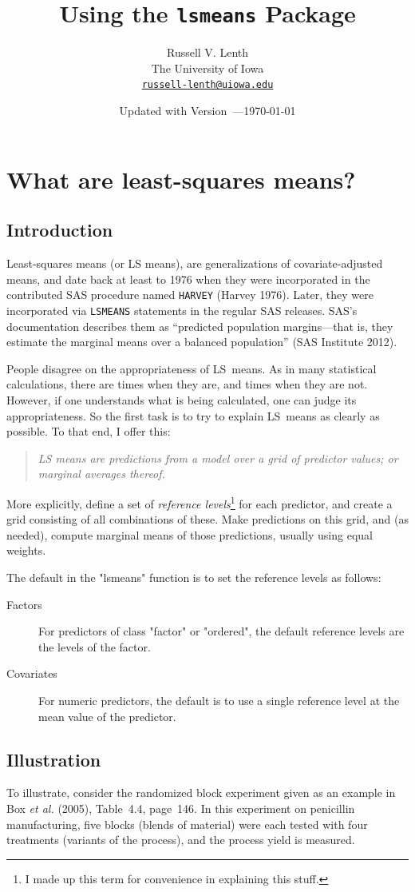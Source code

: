 \documentclass{article}
\title{Using the \texttt{lsmeans} Package}
\author{Russell V. Lenth\\The University of Iowa\\ 
\texttt{\href{mailto:russell-lenth@uiowa.edu}{russell-lenth@uiowa.edu}}}
\date{Updated with \code{lsmeans} Version~\lsmversion---\today}
\def\code{\texttt}
\begin{document}
\maketitle{}

\section{What are least-squares means?}
\subsection{Introduction}
Least-squares means (or LS means), are generalizations of covariate-adjusted means, and date back at least to 1976 when they were incorporated in the contributed SAS procedure named \code{HARVEY} (Harvey 1976). Later, they were incorporated via \code{LSMEANS} statements in the regular SAS releases. SAS's documentation describes them as ``predicted population margins---that is, they estimate the marginal means over a balanced population'' (SAS Institute 2012).

People disagree on the appropriateness of LS~means. As in many statistical calculations, there are times when they are, and times when they are not. However, if one understands what is being calculated, one can judge its appropriateness. So the first task is to try to explain LS~means as clearly as possible. To that end, I offer this:
\begin{quote}\it
LS means are predictions from a model over a grid of predictor values; or marginal averages thereof. 
\end{quote}
More explicitly, define a set of \emph{reference levels}\footnote{I made up this term for convenience in explaining this stuff.} for each predictor, and create a grid consisting of all combinations of these. Make predictions on this grid, and (as needed), compute marginal means of those predictions, usually using equal weights.

The default in the "lsmeans" function is to set the reference levels as follows:
\begin{description}
\item[Factors] For predictors of class "factor" or "ordered", the default reference levels are the levels of the factor.
\item[Covariates] For numeric predictors, the default is to use a single reference level at the mean value of the predictor.
\end{description}

\subsection{Illustration}
To illustrate, consider the randomized block experiment given as an example in Box \emph{et al.} (2005), Table~4.4, page~146. In this experiment on penicillin manufacturing, five blocks (blends of material) were each tested with four treatments (variants of the process), and the process yield is measured.
\end{document}
